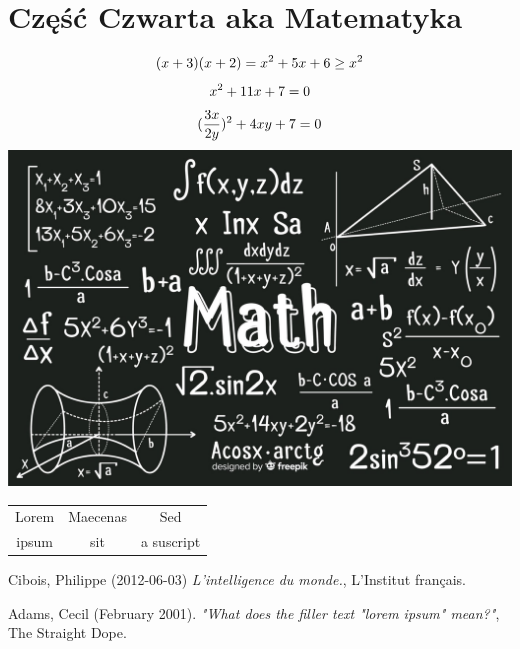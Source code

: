 \documentclass[]{article}
\begin{document}
\section{Część Czwarta aka Matematyka}
\begin{equation}
(x+3)(x+2)=x^2+5x+6\notag\\
\geq x^2
\end{equation}
\begin{equation}
x^2+11x+7=0\notag
\end{equation}
\begin{equation}
(\frac{3x}{2y})^2 + 4xy + 7 = 0\notag
\end{equation}
\includegraphics[scale=0.25]{math}
\begin{center}
\begin{tabular}{ | c | c | c | }
  \hline
  Lorem & Maecenas & Sed \\
  ipsum & sit &  a suscript \\
  \hline
\end{tabular}
\end{center}
\newpage
\begin{thebibliography}{2}
Cibois, Philippe (2012-06-03) \emph{ L'intelligence du monde.}, L'Institut français.

Adams, Cecil (February 2001). \emph{ "What does the filler text "lorem ipsum" mean?"}, The Straight Dope.
\end{thebibliography}
\end{document}
